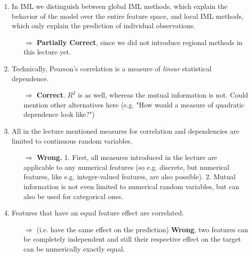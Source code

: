\begin{enumerate}
\begin{itemize}
    	\end{itemize}
    	\item In IML we distinguish between global IML methods, which explain the behavior of the model over the entire feature space, and local IML methods, which only explain the prediction of individual observations. 
    	\begin{itemize}
    		\item[$\Rightarrow$] \textbf{Partially Correct}, since we did not introduce regional methods in this lecture yet.
    	\end{itemize}
        \item Technically, Pearson's correlation is a measure of \textit{linear} statistical dependence. 
        \begin{itemize}
        	\item[$\Rightarrow$] \textbf{Correct}. \(R^2\) is as well, whereas the mutual information is not. Could mention other alternatives here (e.g. "How would a measure of quadratic dependence look like?")
        \end{itemize}
    	\item All in the lecture mentioned measures for correlation and dependencies are limited to continuous random variables.
    	\begin{itemize}
    		\item[$\Rightarrow$] \textbf{Wrong.} 1. First, all measures introduced in the lecture are applicable to any numerical features (so e.g. discrete, but numerical features, like e.g. integer-valued features, are also possible). 2. Mutual information is not even limited to numerical random variables, but can also be used for categorical ones.
    	\end{itemize}
        \item Features that have an equal feature effect are correlated. 
        \begin{itemize}
        	\item[$\Rightarrow$] (i.e. have the same effect on the prediction) \textbf{Wrong}, two features can be completely independent and still their respective effect on the target can be numerically exactly equal.

\end{itemize}
\end{enumerate}
